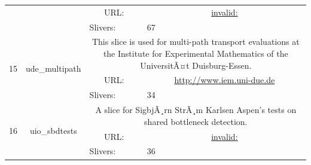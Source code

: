 \begin{small}
\begin{center}
\begin{longtable}{|c|c|c|c|}
  &  & \multicolumn{1}{|p{5em}|}{URL:} & \multicolumn{1}{|p{22.5em}|}{\url{invalid:}} \\* \cline{3-3}\cline{4-4}
  &  & \multicolumn{1}{|l|}{Slivers:} & \multicolumn{1}{|l|}{67} \\ \hline
 \multirow{3}{*}{15} & \multirow{3}{*}{\index{ude\_multipath}\index{Slice!ude\_multipath}ude\_multipath} & \multicolumn{2}{|p{30em}|}{This slice is used for multi-path transport evaluations at the Institute for Experimental Mathematics of the UniversitÃ¤t Duisburg-Essen.} \\* \cline{3-3}\cline{4-4}
  &  & \multicolumn{1}{|p{5em}|}{URL:} & \multicolumn{1}{|p{22.5em}|}{\url{http://www.iem.uni-due.de}} \\* \cline{3-3}\cline{4-4}
  &  & \multicolumn{1}{|l|}{Slivers:} & \multicolumn{1}{|l|}{34} \\ \hline
 \multirow{3}{*}{16} & \multirow{3}{*}{\index{uio\_sbdtests}\index{Slice!uio\_sbdtests}uio\_sbdtests} & \multicolumn{2}{|p{30em}|}{A slice for SigbjÃ¸rn StrÃ¸m Karlsen Aspen's tests on shared bottleneck detection.} \\* \cline{3-3}\cline{4-4}
  &  & \multicolumn{1}{|p{5em}|}{URL:} & \multicolumn{1}{|p{22.5em}|}{\url{invalid:}} \\* \cline{3-3}\cline{4-4}
  &  & \multicolumn{1}{|l|}{Slivers:} & \multicolumn{1}{|l|}{36} \\ \hline
\end{longtable}
\end{center}
\end{small}
